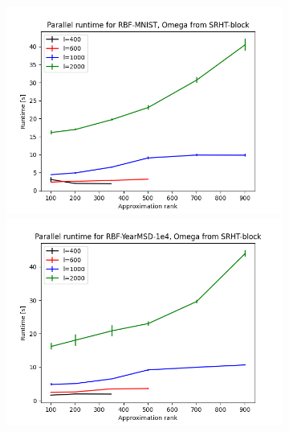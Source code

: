 \documentclass{article}
\theoremstyle{definition}
\begin{document}
\begin{figure}
\centering
\hfill\begin{subfigure}[t]{\textwidth+20pt\relax}
    \includegraphics[width=\dimexpr\linewidth-20pt\relax]{plots/runtime/runtime_par_RBF-MNIST_SRHT-block.png}
    \includegraphics[width=\dimexpr\linewidth-20pt\relax]{plots/runtime/runtime_par_RBF-YearMSD-1e4_SRHT-block.png}

\end{subfigure}
\end{figure}
\end{document}
